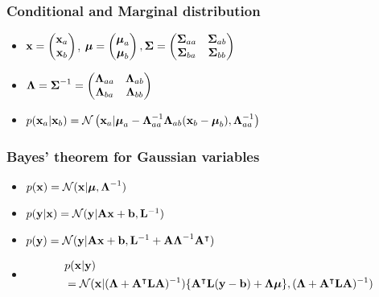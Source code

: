 \documentclass[10pt,mathserif]{beamer}
\begin{document}
\begin{frame}
\frametitle{Conditional and Marginal distribution}
\begin{itemize}
\item $\mathbf{x}=\begin{pmatrix}\mathbf{x}_a\\\mathbf{x}_b\end{pmatrix}$, $\boldsymbol{\mu} = \begin{pmatrix} \boldsymbol{\mu}_a\\\boldsymbol{\mu}_b\end{pmatrix}, \boldsymbol{\Sigma} = \begin{pmatrix}\boldsymbol{\Sigma}_{aa} & \boldsymbol{\Sigma}_{ab}\\ \boldsymbol{\Sigma}_{ba} & \boldsymbol{\Sigma}_{bb} \end{pmatrix}$
\item $\boldsymbol{\Lambda} = \boldsymbol{\Sigma}^{-1}=\begin{pmatrix}\boldsymbol{\Lambda}_{aa} & \boldsymbol{\Lambda}_{ab} \\ \boldsymbol{\Lambda}_{ba} & \boldsymbol{\Lambda}_{bb}\end{pmatrix}$
\item $p(\mathbf{x}_a| \mathbf{x}_b) = \mathcal{N}\left(\mathbf{x}_a| \boldsymbol{\mu}_a - \boldsymbol{\Lambda}_{aa}^{-1}\boldsymbol{\Lambda}_{ab}(\mathbf{x}_b-\boldsymbol{\mu}_b), \boldsymbol{\Lambda}_{aa}^{-1}\right)$ 
\end{itemize}
\end{frame}
\begin{frame}
\frametitle{Bayes' theorem for Gaussian variables}
\begin{itemize}
\item $p(\mathbf{x}) = \mathcal{N}(\mathbf{x} | \boldsymbol{\mu}, \boldsymbol{\Lambda}^{-1})$
\item $p(\mathbf{y}| \mathbf{x}) = \mathcal{N}(\mathbf{y} | \mathbf{A}\mathbf{x}+\mathbf{b}, \mathbf{L}^{-1})$
\item $p(\mathbf{y}) = \mathcal{N}(\mathbf{y}| \mathbf{A}\mathbf{x} + \mathbf{b}, \mathbf{L}^{-1}+\mathbf{A}\boldsymbol{\Lambda}^{-1}\mathbf{A}^{\intercal})$
\item 
\begin{align}
&p(\mathbf{x}| \mathbf{y})\nonumber\\
&= \mathcal{N}(\mathbf{x}| (\boldsymbol{\Lambda}+\mathbf{A}^{\intercal}\mathbf{L}\mathbf{A} )^{-1})\{\mathbf{A}^{\intercal}\mathbf{L}(\mathbf{y}-\mathbf{b})+\boldsymbol{\Lambda}\boldsymbol{\mu} \}, (\boldsymbol{\Lambda}+\mathbf{A}^{\intercal}\mathbf{L}\mathbf{A} )^{-1})\nonumber
\end{align}
\end{itemize}
\end{frame}
\end{document}
